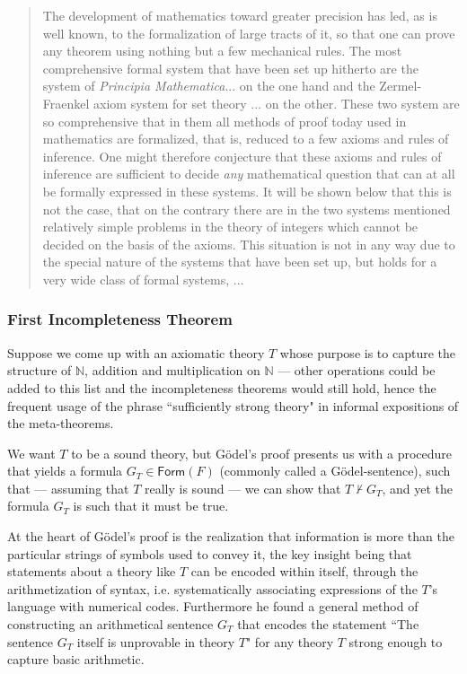 \documentclass[12p]{article}
\newcommand{\NN}{\mathbb{N}}
\theoremstyle{definition}
\begin{document}
\begin{quote}
	The development of mathematics toward greater precision has led, as is well known, to the formalization of large tracts of it, so that one can prove any theorem using nothing but a few mechanical rules. The most comprehensive formal system that have been set up hitherto are the system of \textit{Principia Mathematica}... on the one hand and the Zermel-Fraenkel axiom system for set theory ... on the other. These two system are so comprehensive that in them all methods of proof today used in mathematics are formalized, that is, reduced to a few axioms and rules of inference. One might therefore conjecture that these axioms and rules of inference are sufficient to decide \textit{any} mathematical question that can at all be formally expressed in these systems. It will be shown below that this is not the case, that on the contrary there are in the two systems mentioned relatively simple problems in the theory of integers which cannot be decided on the basis of the axioms. This situation is not in any way due to the special nature of the systems that have been set up, but holds for a very wide class of formal systems, ...
\end{quote}
\subsubsection{First Incompleteness Theorem}
Suppose we come up with an axiomatic theory $T$ whose purpose is to capture the structure of $\NN$, addition and multiplication on $\NN$ --- other operations could be added to this list and the incompleteness theorems would still hold, hence the frequent usage of the phrase ``sufficiently strong theory" in informal expositions of the meta-theorems.


We want $T$ to be a sound theory, but Gödel's proof presents us with a procedure that yields a formula $G_T \in \textsf{Form}(F)$ (commonly called a Gödel-sentence), such that --- assuming that $T$ really is sound --- we can show that $T \nvdash G_T$, and yet the formula $G_T$ is such that it must be true.


At the heart of Gödel's proof is the realization that information is more than the particular strings of symbols used to convey it, the key insight being that statements about a theory like $T$ can be encoded within itself, through the arithmetization of syntax, i.e. systematically associating expressions of the $T$'s language with numerical codes. Furthermore he found a general method of constructing an arithmetical sentence $G_T$ that encodes the statement ``The sentence $G_T$ itself is unprovable in theory $T$"  for any theory $T$ strong enough to capture basic arithmetic. 
\end{document}
